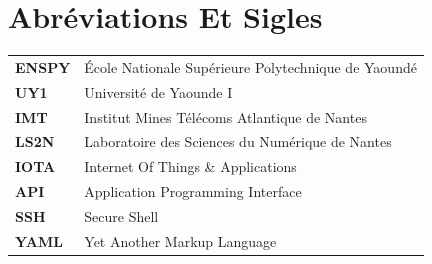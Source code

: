 \chapter*{Abréviations Et Sigles }
\begin{table}[H]
    \centering
    \begin{tabular}{p{2cm} p{10cm}}
        \textbf{ENSPY} & École Nationale Supérieure Polytechnique de Yaoundé \\  
        \textbf{UY1} & Université de Yaounde I \\ 
        \textbf{IMT} & Institut Mines Télécoms Atlantique de Nantes\\ 
        \textbf{LS2N} & Laboratoire des Sciences du Numérique de Nantes \\ 
        \textbf{IOTA} & Internet Of Things \& Applications \\ 
        \textbf{API} & Application Programming Interface \\
        \textbf{SSH} & Secure Shell \\
        \textbf{YAML} & Yet Another Markup Language \\
    \end{tabular}
\end{table}

\newpage

